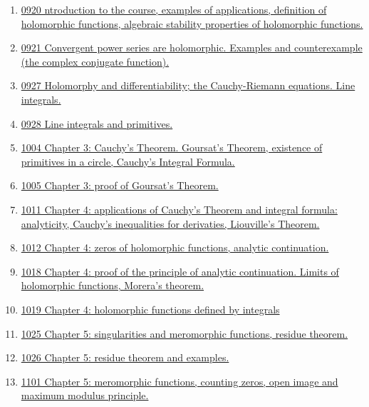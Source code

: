 \documentclass[11pt]{article}
\begin{document}
\begin{enumerate}
	\item \href{https://mp.weixin.qq.com/s/1V5WlvLobUlTQvd6qhED5w}{0920 ntroduction to the course, examples of applications, definition of holomorphic functions, algebraic stability properties of holomorphic functions.}	%
	\item \href{https://mp.weixin.qq.com/s/n2yrgT92ke6giWgYppFXSg}{0921 Convergent power series are holomorphic. Examples and counterexample (the complex conjugate function).}	%
	\item \href{https://mp.weixin.qq.com/s/7c2xUrhKdUduxahNAhHSdg}{0927 Holomorphy and differentiability; the Cauchy-Riemann equations. Line integrals.}	%
	\item \href{https://mp.weixin.qq.com/s/_R3iUFgKnrECzC7tK-3yGw}{0928 Line integrals and primitives.}	%
	\item \href{https://mp.weixin.qq.com/s/qwV89s3UnpKiZFriLYDGBw}{1004 Chapter 3: Cauchy's Theorem. Goursat's Theorem, existence of primitives in a circle, Cauchy's Integral Formula.}	%
	\item \href{https://mp.weixin.qq.com/s/SqMPcf0S0bxMBPRC3lGRow}{1005 Chapter 3: proof of Goursat's Theorem.}	%
	\item \href{https://mp.weixin.qq.com/s/uCPR9J4GUApWyei4y8b53Q}{1011 Chapter 4: applications of Cauchy's Theorem and integral formula: analyticity, Cauchy's inequalities for derivaties, Liouville's Theorem.}	%
	\item \href{https://mp.weixin.qq.com/s/0-IKbwCtH2JllC_Ztezi6A}{1012 Chapter 4: zeros of holomorphic functions, analytic continuation.}	%
	\item \href{https://mp.weixin.qq.com/s/rzRMuA_swjtkfwjR0aksNA}{1018 Chapter 4: proof of the principle of analytic continuation. Limits of holomorphic functions, Morera's theorem.}	%
	\item \href{https://mp.weixin.qq.com/s/GN1QItDrDV3CceN8hj8Geg}{1019 Chapter 4: holomorphic functions defined by integrals}	%
	\item \href{https://mp.weixin.qq.com/s/cynhCsc4fDN3wJXWi477XQ}{1025 Chapter 5: singularities and meromorphic functions, residue theorem.}	%
	\item \href{https://mp.weixin.qq.com/s/1G9qAeAPKLpde8mok3ed4A}{1026 Chapter 5: residue theorem and examples.}	%
	\item \href{https://mp.weixin.qq.com/s/nTwCeq-N-Q9FTuV2byz7xQ}{1101 Chapter 5: meromorphic functions, counting zeros, open image and maximum modulus principle.}	%

\end{enumerate}
\end{document}
